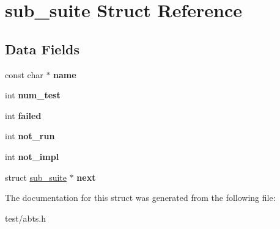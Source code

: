\hypertarget{structsub__suite}{\section{sub\-\_\-suite Struct Reference}
\label{structsub__suite}
}
\subsection*{Data Fields}
\begin{DoxyCompactItemize}
\item 
\hypertarget{structsub__suite_a73bc0f7d5cd24a1854b052d6e6f2b710}{const char $\ast$ {\bfseries name}}\label{structsub__suite_a73bc0f7d5cd24a1854b052d6e6f2b710}

\item 
\hypertarget{structsub__suite_a6093827736a60fc08bf3bfcf9e3da403}{int {\bfseries num\-\_\-test}}\label{structsub__suite_a6093827736a60fc08bf3bfcf9e3da403}

\item 
\hypertarget{structsub__suite_a556b08e37f50e73f6f189cf29ee4a32a}{int {\bfseries failed}}\label{structsub__suite_a556b08e37f50e73f6f189cf29ee4a32a}

\item 
\hypertarget{structsub__suite_a835c7fbf0595e4f2e0ace47452d9d4eb}{int {\bfseries not\-\_\-run}}\label{structsub__suite_a835c7fbf0595e4f2e0ace47452d9d4eb}

\item 
\hypertarget{structsub__suite_a55c4fb6defb8da2e37217589e5b1c7f1}{int {\bfseries not\-\_\-impl}}\label{structsub__suite_a55c4fb6defb8da2e37217589e5b1c7f1}

\item 
\hypertarget{structsub__suite_a75601c7768ede9e010ab6473e565b991}{struct \hyperlink{structsub__suite}{sub\-\_\-suite} $\ast$ {\bfseries next}}\label{structsub__suite_a75601c7768ede9e010ab6473e565b991}

\end{DoxyCompactItemize}


The documentation for this struct was generated from the following file\-:\begin{DoxyCompactItemize}
\item 
test/abts.\-h\end{DoxyCompactItemize}
